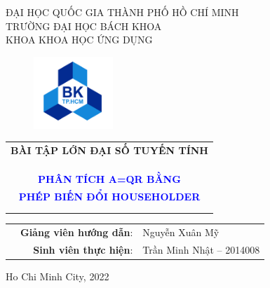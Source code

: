 \documentclass[11pt,a4paper]{article}
\begin{document}
\begin{titlepage}
	\begin{center}
		ĐẠI HỌC QUỐC GIA THÀNH PHỐ HỒ CHÍ MINH\\
		TRƯỜNG ĐẠI HỌC BÁCH KHOA\\
		KHOA KHOA HỌC ỨNG DỤNG\\
	\end{center}
	\begin{figure}[h!]
\begin{center}
\vspace{0.5cm}
\includegraphics[width=3cm]{hcmut.png}
\end{center}
\end{figure}
	\vspace{2cm}
	\begin{center}
		\begin{tabular}{c}
			\textbf{{\Large BÀI TẬP LỚN ĐẠI SỐ TUYẾN TÍNH}}\\ \\
			\hline
			\\ \\
			\textbf{\huge{\textcolor{blue}{PHÂN TÍCH A=QR BẰNG}}} \\
			\textbf{\huge{\textcolor{blue}{PHÉP BIẾN ĐỔI HOUSEHOLDER}}} \\
			\\ \\
			\hline
		\end{tabular}
	\end{center}
	\vspace{3cm}
	
	\begin{table}[h]
\begin{tabular}{rrl}
\hspace{5 cm} & \textbf{Giảng viên hướng dẫn}: &Nguyễn Xuân Mỹ\\

& \textbf{Sinh viên thực hiện}: & Trần Minh Nhật  -- 2014008\\

\end{tabular}
\end{table}
	\vspace{3cm}
	\begin{center}
		{\footnotesize Ho Chi Minh City, 2022}
	\end{center}
\end{titlepage}
\newpage

\tableofcontents

\newpage

\newpage 
%
\end{document}
